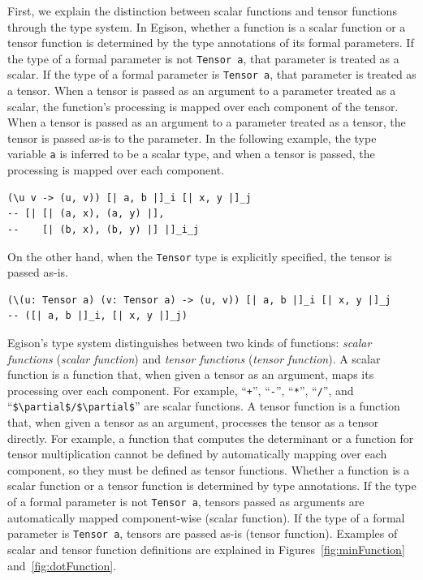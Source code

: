 First, we explain the distinction between scalar functions and tensor functions through the type system.
In Egison, whether a function is a scalar function or a tensor function is determined by the type annotations of its formal parameters.
If the type of a formal parameter is not \lstinline{Tensor a}, that parameter is treated as a scalar.
If the type of a formal parameter is \lstinline{Tensor a}, that parameter is treated as a tensor.
When a tensor is passed as an argument to a parameter treated as a scalar, the function's processing is mapped over each component of the tensor.
When a tensor is passed as an argument to a parameter treated as a tensor, the tensor is passed as-is to the parameter.
In the following example, the type variable \lstinline{a} is inferred to be a scalar type, and when a tensor is passed, the processing is mapped over each component.
\begin{lstlisting}[language=egison,numbers=none]
(\u v -> (u, v)) [| a, b |]_i [| x, y |]_j
-- [| [| (a, x), (a, y) |],
--    [| (b, x), (b, y) |] |]_i_j
\end{lstlisting}
On the other hand, when the \lstinline{Tensor} type is explicitly specified, the tensor is passed as-is.
\begin{lstlisting}[language=egison,numbers=none]
(\(u: Tensor a) (v: Tensor a) -> (u, v)) [| a, b |]_i [| x, y |]_j
-- ([| a, b |]_i, [| x, y |]_j)
\end{lstlisting}

Egison's type system distinguishes between two kinds of functions: \emph{scalar functions} (\emph{scalar function}) and \emph{tensor functions} (\emph{tensor function}).
A scalar function is a function that, when given a tensor as an argument, maps its processing over each component.
For example, ``\lstinline|+|'', ``\lstinline|-|'', ``\lstinline|*|'', ``\lstinline|/|'', and ``\lstinline[mathescape]!$\partial$/$\partial$!'' are scalar functions.
A tensor function is a function that, when given a tensor as an argument, processes the tensor as a tensor directly.
For example, a function that computes the determinant or a function for tensor multiplication cannot be defined by automatically mapping over each component, so they must be defined as tensor functions.
Whether a function is a scalar function or a tensor function is determined by type annotations.
If the type of a formal parameter is not \lstinline{Tensor a}, tensors passed as arguments are automatically mapped component-wise (scalar function).
If the type of a formal parameter is \lstinline{Tensor a}, tensors are passed as-is (tensor function).
Examples of scalar and tensor function definitions are explained in Figures~\ref{fig:minFunction} and~\ref{fig:dotFunction}.


